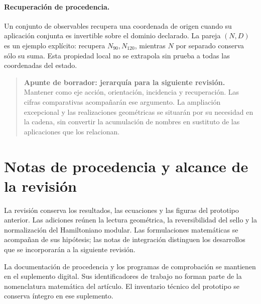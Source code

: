 \documentclass[11pt,a4paper]{article}
\numberwithin{equation}{section}
\theoremstyle{definition}
\newenvironment{apunte}[1]{\par\Needspace{6\baselineskip}\smallskip
\begin{quote}\small\raggedright\color{ink}\noindent\textbf{Apunte de borrador: #1.}\ }
{\end{quote}\smallskip}
\begin{document}
\paragraph{Recuperación de procedencia.}
Un conjunto de observables recupera una coordenada de origen cuando su
aplicación conjunta es invertible sobre el dominio declarado.
La pareja $(N,D)$ es un ejemplo explícito: recupera $N_{90},N_{120}$,
mientras $N$ por separado conserva sólo su suma. Esta propiedad local
no se extrapola sin prueba a todas las coordenadas del estado.

\begin{apunte}{jerarquía para la siguiente revisión}
Mantener como eje acción, orientación, incidencia y recuperación.
Las cifras comparativas acompañarán ese argumento. La ampliación
excepcional y las realizaciones geométricas se situarán por su
necesidad en la cadena, sin convertir la acumulación de nombres
en sustituto de las aplicaciones que los relacionan.
\end{apunte}

\clearpage
\appendix
\section{Notas de procedencia y alcance de la revisión}
La revisión conserva los resultados, las ecuaciones y las figuras del
prototipo anterior. Las adiciones reúnen la lectura geométrica, la
reversibilidad del sello y la normalización del Hamiltoniano modular.
Las formulaciones matemáticas se acompañan de sus hipótesis; las notas
de integración distinguen los desarrollos que se incorporarán a la
siguiente revisión.

La documentación de procedencia y los programas de comprobación se
mantienen en el suplemento digital. Sus identificadores de trabajo
no forman parte de la nomenclatura matemática del artículo. El
inventario técnico del prototipo se conserva íntegro en ese suplemento.
\end{document}
